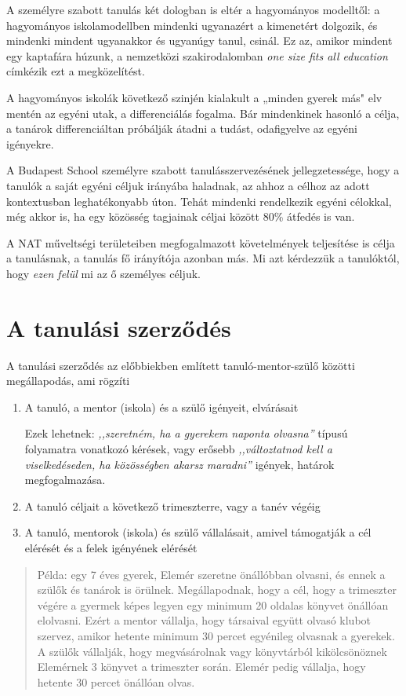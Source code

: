 A személyre szabott tanulás két dologban is eltér a hagyományos modelltől: a hagyományos iskolamodellben mindenki ugyanazért a kimenetért dolgozik, és mindenki mindent ugyanakkor és ugyanúgy tanul, csinál. Ez az, amikor mindent egy kaptafára húzunk, a nemzetközi szakirodalomban \emph{one size fits all education} címkézik ezt a megközelítést.

A hagyományos iskolák következő szinjén kialakult a „minden gyerek más" elv mentén az egyéni utak, a differenciálás fogalma. Bár mindenkinek hasonló a célja, a tanárok differenciáltan próbálják átadni a tudást, odafigyelve az egyéni igényekre.

A Budapest School személyre szabott tanulásszervezésének jellegzetessége, hogy a tanulók a saját egyéni céljuk irányába haladnak, az ahhoz a célhoz az adott kontextusban leghatékonyabb úton. Tehát mindenki rendelkezik egyéni célokkal, még akkor is, ha egy közösség tagjainak céljai között 80\% átfedés is van.

A NAT műveltségi területeiben megfogalmazott követelmények teljesítése is célja a tanulásnak, a tanulás fő irányítója azonban más. Mi azt kérdezzük a tanulóktól, hogy \emph{ezen felül} mi az ő személyes céljuk.

\section{A tanulási szerződés}


A tanulási szerződés az előbbiekben említett tanuló-mentor-szülő közötti megállapodás, ami rögzíti
\begin{enumerate}
\item A tanuló, a mentor (iskola) és a szülő igényeit, elvárásait

    Ezek lehetnek: \emph{,,szeretném, ha a gyerekem naponta olvasna''} típusú folyamatra vonatkozó kérések, vagy erősebb \emph{,,változtatnod kell a viselkedéseden, ha közösségben akarsz maradni''} igények, határok megfogalmazása.

\item A tanuló céljait a következő trimeszterre, vagy a tanév végéig

\item A tanuló, mentorok (iskola) és szülő vállalásait, amivel támogatják a cél elérését és a felek igényének elérését

\end{enumerate}

\begin{quote}
Példa: egy 7 éves gyerek, Elemér szeretne önállóbban olvasni, és ennek a szülők és tanárok is örülnek. Megállapodnak, hogy a cél, hogy a trimeszter végére a gyermek képes legyen egy minimum 20 oldalas könyvet önállóan elolvasni. Ezért a mentor vállalja, hogy társaival együtt olvasó klubot szervez, amikor hetente minimum 30 percet egyénileg olvasnak a gyerekek.
A szülők vállalják, hogy megvásárolnak vagy könyvtárból kikölcsönöznek Elemérnek 3 könyvet a trimeszter során. Elemér pedig vállalja, hogy hetente 30 percet önállóan olvas.
\end{quote}

